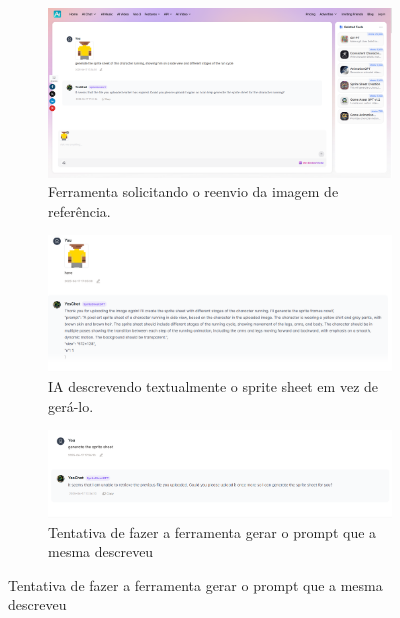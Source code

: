 \begin{figure}[htbp]
    \centering
    \caption{\small Processo da utilização do SpriteSheetGPT em junho/2025}
    \label{fig:yesAI1}

    \begin{subfigure}{1\linewidth}
        \includegraphics[width=1\linewidth]{figs/yesAI/tela1.PNG}
        \caption{\small Ferramenta solicitando o reenvio da imagem de referência.}
        \label{fig:yesAI1a}
    \end{subfigure}
    \begin{subfigure}{1\linewidth}
        \includegraphics[width=1\linewidth]{figs/yesAI/tela2.PNG}
        \caption{\small IA descrevendo textualmente o sprite sheet em vez de gerá-lo.}
        \label{fig:yesAI1b}
    \end{subfigure}
    \begin{subfigure}{1\linewidth}
        \includegraphics[width=1\linewidth]{figs/yesAI/tela3.PNG}
        \caption{\small Tentativa de fazer a ferramenta gerar o prompt que a mesma descreveu}
        \label{fig:yesAI1c}
    \end{subfigure}
    
\end{figure}

